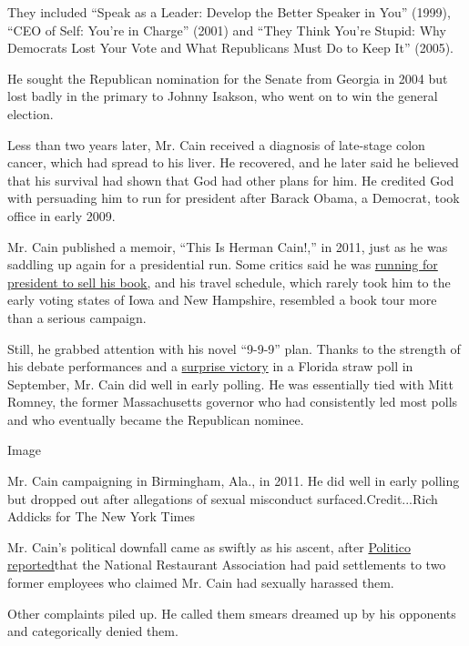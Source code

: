 They included ``Speak as a Leader: Develop the Better Speaker in You''
(1999), ``CEO of Self: You're in Charge'' (2001) and ``They Think You're
Stupid: Why Democrats Lost Your Vote and What Republicans Must Do to
Keep It'' (2005).

He sought the Republican nomination for the Senate from Georgia in 2004
but lost badly in the primary to Johnny Isakson, who went on to win the
general election.

Less than two years later, Mr. Cain received a diagnosis of late-stage
colon cancer, which had spread to his liver. He recovered, and he later
said he believed that his survival had shown that God had other plans
for him. He credited God with persuading him to run for president after
Barack Obama, a Democrat, took office in early 2009.

Mr. Cain published a memoir, ``This Is Herman Cain!,'' in 2011, just as
he was saddling up again for a presidential run. Some critics said he
was
\href{https://www.theatlantic.com/politics/archive/2011/10/herman-cain-skips-out-on-early-states-to-push-his-new-book/246260/}{running
for president to sell his book,} and his travel schedule, which rarely
took him to the early voting states of Iowa and New Hampshire, resembled
a book tour more than a serious campaign.

Still, he grabbed attention with his novel ``9-9-9'' plan. Thanks to the
strength of his debate performances and a
\href{http://thecaucus.blogs.nytimes3xbfgragh.onion/2011/09/24/herman-cain-wins-florida-straw-poll/}{surprise
victory} in a Florida straw poll in September, Mr. Cain did well in
early polling. He was essentially tied with Mitt Romney, the former
Massachusetts governor who had consistently led most polls and who
eventually became the Republican nominee.

Image

Mr. Cain campaigning in Birmingham, Ala., in 2011. He did well in early
polling but dropped out after allegations of sexual misconduct
surfaced.Credit...Rich Addicks for The New York Times

Mr. Cain's political downfall came as swiftly as his ascent, after
\href{https://www.politico.com/story/2011/10/exclusive-2-women-accused-cain-of-inappropriate-behavior-067194}{Politico
reported}that the National Restaurant Association had paid settlements
to two former employees who claimed Mr. Cain had sexually harassed them.

Other complaints piled up. He called them smears dreamed up by his
opponents and categorically denied them.

